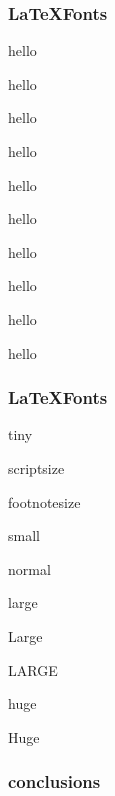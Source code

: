 \begin{frame}\frametitle{\LaTeX Fonts}
\tiny hello

\scriptsize hello

\footnotesize hello

\small hello

\normalsize hello

\large hello

\Large hello

\LARGE hello

\huge hello

\Huge hello
\end{frame}

\begin{frame}\frametitle{\LaTeX Fonts}
\tiny tiny

\scriptsize scriptsize

\footnotesize footnotesize

\small small

\normalsize normal

\large large

\Large Large

\LARGE LARGE 

\huge huge

\Huge Huge

\end{frame}


\usebackgroundtemplate{}

\begin{frame}\frametitle{conclusions}

\vfill
{}
\vfill
{}
\end{frame}
